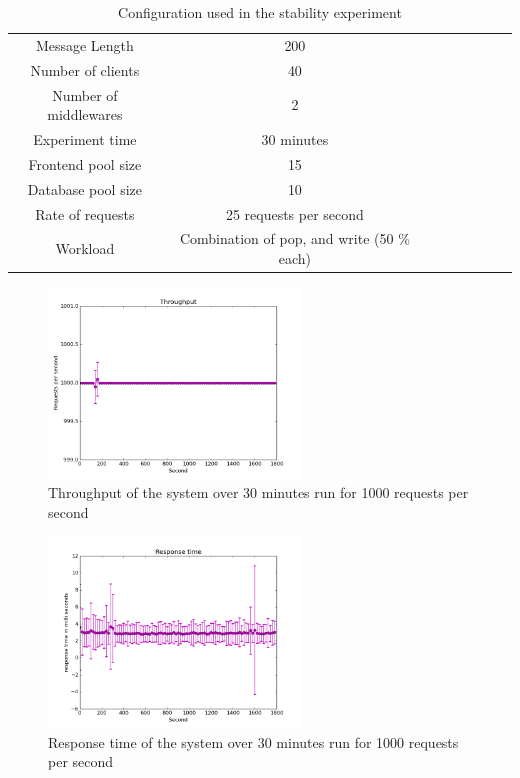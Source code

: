 \documentclass[11pt]{article}
\begin{document}
\begin{table}[ht]
\centering
\begin{tabular}{c|ccccccc}
\hline
\rowcolor{myblue}
Message Length        & 200 \\
\rowcolor{mypink}
Number of clients     & 40 \\
\rowcolor{myblue}
Number of middlewares & 2 \\
\rowcolor{mypink}
Experiment time       & 30 minutes \\
\rowcolor{myblue}
Frontend pool size    & 15 \\
\rowcolor{mypink}
Database pool size    & 10 \\
\rowcolor{myblue}
Rate of requests      & 25 requests per second \\ 
\rowcolor{mypink}
Workload              & Combination of pop, and write (50 \% each) \\
\hline
\end{tabular}
\centering
\caption{Configuration used in the stability experiment}
\label{table:stability}
\end{table}

\begin{figure}[H]
  \includegraphics[width=0.6\textwidth,page=1]{figures/stability_throughput}
  \centering
  \caption{Throughput of the system over 30 minutes run for 1000 requests per second}
  \label{fig:stability_throughput}
\end{figure}

\begin{figure}[H]
  \includegraphics[width=0.6\textwidth,page=1]{figures/stability_response_time}
  \centering
  \caption{Response time of the system over 30 minutes run for 1000 requests per second}
  \label{fig:stability_response_time}
\end{figure}
\end{document}
